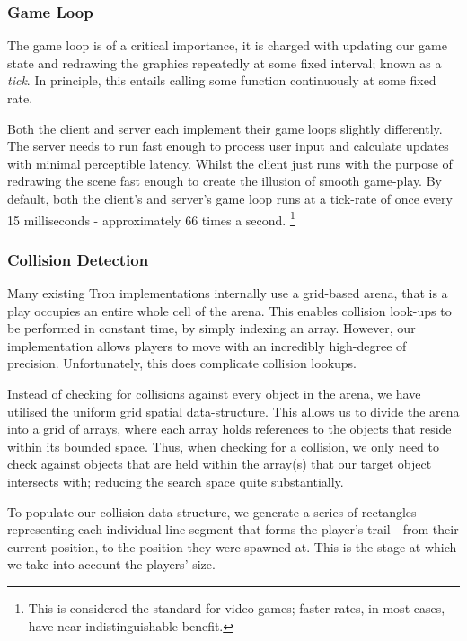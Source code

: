 \documentclass{standalone}
\begin{document}
		\subsubsection{Game Loop}
			The game loop is of a critical importance, it is charged with updating our game state and redrawing the graphics repeatedly at some fixed interval; known as a \emph{tick}. In principle, this entails calling some function continuously at some fixed rate.

			Both the client and server each implement their game loops slightly differently. The server needs to run fast enough to process user input and calculate updates with minimal perceptible latency. Whilst the client just runs with the purpose of redrawing the scene fast enough to create the illusion of smooth game-play. By default, both the client's and server's game loop runs at a tick-rate of once every 15 milliseconds - approximately 66 times a second. \footnote{This is considered the standard for video-games; faster rates, in most cases, have near indistinguishable benefit.}

		\subsubsection{Collision Detection} \label{collisionDetection}
			Many existing Tron implementations internally use a grid-based arena, that is a play occupies an entire whole cell of the arena. This enables collision look-ups to be performed in constant time, by simply indexing an array. However, our implementation allows players to move with an incredibly high-degree of precision\parencite{JsNumbers}. Unfortunately, this does complicate collision lookups.

			Instead of checking for collisions against every object in the arena, we have utilised the uniform grid spatial data-structure. This allows us to divide the arena into a grid of arrays, where each array holds references to the objects that reside within its bounded space. Thus, when checking for a collision, we only need to check against objects that are held within the array(s) that our target object intersects with; reducing the search space quite substantially.

			To populate our collision data-structure, we generate a series of rectangles representing each individual line-segment that forms the player's trail - from their current position, to the position they were spawned at. This is the stage at which we take into account the players' size.
\end{document}
